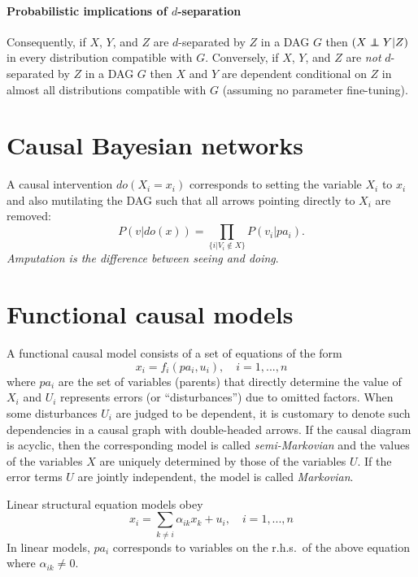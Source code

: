\documentclass[11pt]{article}
\numberwithin{equation}{section}
\newcommand\indep{\protect\mathpalette{\protect\independenT}{\perp}}
\def\independenT#1#2{\mathrel{\rlap{$#1#2$}\mkern2mu{#1#2}}}
\begin{document}
\paragraph{Probabilistic implications of $d$-separation} 
Consequently, if $X$, $Y$, and $Z$ are $d$-separated by $Z$ in a DAG $G$ then $(X \indep Y | Z)$ in every distribution compatible with $G$. Conversely, if $X$, $Y$, and $Z$ are \textit{not} $d$-separated by $Z$ in a DAG $G$ then $X$ and $Y$ are dependent conditional on $Z$ in almost all distributions compatible with $G$ (assuming no parameter fine-tuning).

\section{Causal Bayesian networks}
A causal intervention $do(X_i = x_i)$ corresponds to setting the variable $X_i$ to $x_i$ and also mutilating the DAG such that all arrows pointing directly to $X_i$ are removed:
\begin{equation}
P(v|do(x)) = \prod_{\{i|V_i \notin X\}} P(v_i | pa_i).
\end{equation}
\textit{Amputation is the difference between seeing and doing}.

\section{Functional causal models}
A functional causal model consists of a set of equations of the form
\begin{equation}
x_i = f_i(pa_i, u_i), \quad i=1,...,n
\end{equation}
where $pa_i$ are the set of variables (parents) that directly determine the value of $X_i$ and $U_i$ represents errors (or ``disturbances'') due to omitted factors. When some disturbances $U_i$ are judged to be dependent, it is customary to denote such dependencies in a causal graph with double-headed arrows. If the causal diagram is acyclic, then the corresponding model is called \textit{semi-Markovian} and the values of the variables $X$ are uniquely determined by those of the variables $U$. If the error terms $U$ are jointly independent, the model is called \textit{Markovian}.

Linear structural equation models obey
\begin{equation}
x_i = \sum_{k \neq i} \alpha_{ik} x_k + u_i, \quad i=1,...,n
\end{equation}
In linear models, $pa_i$ corresponds to variables on the r.h.s.\ of the above equation where $\alpha_{ik} \neq 0$.
\end{document}
